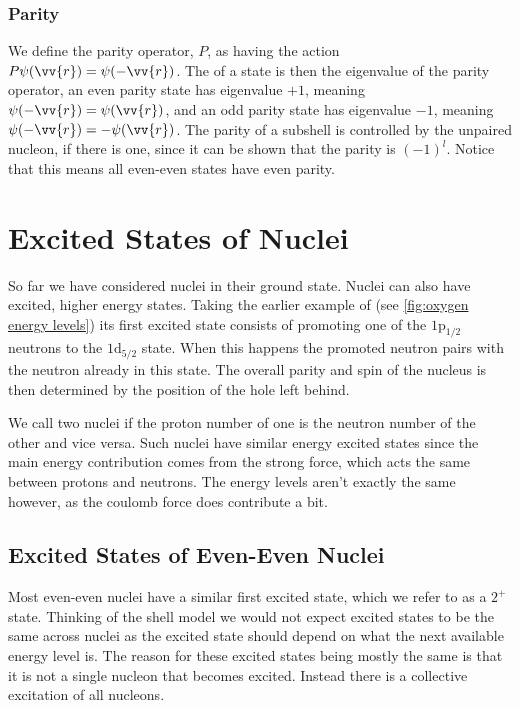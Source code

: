 \documentclass[fleqn]{NotesClass}
\begin{document}
    \subsection{Parity}
    We define the parity operator, \(P\), as having the action \(P\psi(\vv{r}) = \psi(-\vv{r})\).
    The  of a state is then the eigenvalue of the parity operator, an even parity state has eigenvalue \(+1\), meaning \(\psi(-\vv{r}) = \psi(\vv{r})\), and an odd parity state has eigenvalue \(-1\), meaning \(\psi(-\vv{r}) = -\psi(\vv{r})\).
    The parity of a subshell is controlled by the unpaired nucleon, if there is one, since it can be shown that the parity is \((-1)^{l}\).
    Notice that this means all even-even states have even parity.
    
    \chapter{Excited States of Nuclei}
    So far we have considered nuclei in their ground state.
    Nuclei can also have excited, higher energy states.
    Taking the earlier example of  (see \cref{fig:oxygen energy levels}) its first excited state consists of promoting one of the \(1\mathrm{p}_{1/2}\) neutrons to the \(1\mathrm{d}_{5/2}\) state.
    When this happens the promoted neutron pairs with the neutron already in this state.
    The overall parity and spin of the nucleus is then determined by the position of the hole left behind.
    
    We call two nuclei  if the proton number of one is the neutron number of the other and vice versa.
    Such nuclei have similar energy excited states since the main energy contribution comes from the strong force, which acts the same between protons and neutrons.
    The energy levels aren't exactly the same however, as the coulomb force does contribute a bit.
    
    \section{Excited States of Even-Even Nuclei}
    Most even-even nuclei have a similar first excited state, which we refer to as a \(2^+\) state.
    Thinking of the shell model we would not expect excited states to be the same across nuclei as the excited state should depend on what the next available energy level is.
    The reason for these excited states being mostly the same is that it is not a single nucleon that becomes excited.
    Instead there is a collective excitation of all nucleons.
    
\end{document}
